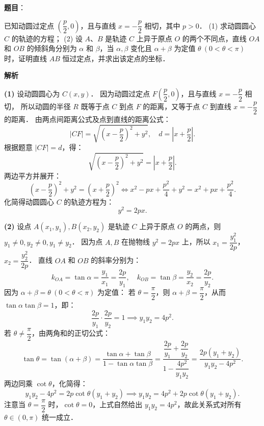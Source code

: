 \begin{answer}


\end{answer}
\begin{answer}

\textbf{题目}：

已知动圆过定点 $\left(\dfrac{p}{2}, 0\right)$，且与直线 $x = -\dfrac{p}{2}$ 相切，其中 $p > 0$．
(1) 求动圆圆心 $C$ 的轨迹的方程；
(2) 设 $A$、$B$ 是轨迹 $C$ 上异于原点 $O$ 的两个不同点，直线 $OA$ 和 $OB$ 的倾斜角分别为 $\alpha$ 和 $\beta$，当 $\alpha, \beta$ 变化且 $\alpha + \beta$ 为定值 $\theta\ (0 < \theta < \pi)$ 时，证明直线 $AB$ 恒过定点，并求出该定点的坐标．

\textbf{解析}

\textbf{(1)}
设动圆圆心为 $C(x, y)$．
因为动圆过定点 $F\left(\dfrac{p}{2}, 0\right)$，且与直线 $x = -\dfrac{p}{2}$ 相切，
所以动圆的半径 $R$ 既等于点 $C$ 到点 $F$ 的距离，又等于点 $C$ 到直线 $x = -\dfrac{p}{2}$ 的距离．
由两点间距离公式及点到直线的距离公式：
\nopagebreak[4]
\[
|CF| = \sqrt{\left(x - \dfrac{p}{2}\right)^2 + y^2}, \quad d = \left|x + \dfrac{p}{2}\right|.
\]
根据题意 $|CF| = d$，得：
\nopagebreak[4]
\[
\sqrt{\left(x - \dfrac{p}{2}\right)^2 + y^2} = \left|x + \dfrac{p}{2}\right|.
\]
两边平方并展开：
\nopagebreak[4]
\[
\left(x - \dfrac{p}{2}\right)^2 + y^2 = \left(x + \dfrac{p}{2}\right)^2 \iff x^2 - px + \dfrac{p^2}{4} + y^2 = x^2 + px + \dfrac{p^2}{4}.
\]
化简得动圆圆心 $C$ 的轨迹方程为：
\nopagebreak[4]
\[
y^2 = 2px.
\]

\textbf{(2)}
设点 $A(x_1, y_1), B(x_2, y_2)$ 是轨迹 $C$ 上异于原点 $O$ 的两点，则 $y_1 \neq 0, y_2 \neq 0, y_1 \neq y_2$．
因为点 $A, B$ 在抛物线 $y^2 = 2px$ 上，所以 $x_1 = \dfrac{y_1^2}{2p}$，$x_2 = \dfrac{y_2^2}{2p}$．
直线 $OA$ 和 $OB$ 的斜率分别为：
\nopagebreak[4]
\[
k_{OA} = \tan\alpha = \dfrac{y_1}{x_1} = \dfrac{2p}{y_1}, \quad k_{OB} = \tan\beta = \dfrac{y_2}{x_2} = \dfrac{2p}{y_2}.
\]
因为 $\alpha + \beta = \theta\ (0 < \theta < \pi)$ 为定值：
若 $\theta = \dfrac{\pi}{2}$，则 $\alpha + \beta = \dfrac{\pi}{2}$，从而 $\tan\alpha \tan\beta = 1$，即：
\nopagebreak[4]
\[
\dfrac{2p}{y_1} \cdot \dfrac{2p}{y_2} = 1 \implies y_1 y_2 = 4p^2.
\]
若 $\theta \neq \dfrac{\pi}{2}$，由两角和的正切公式：
\nopagebreak[4]
\[
\tan\theta = \tan(\alpha + \beta) = \dfrac{\tan\alpha + \tan\beta}{1 - \tan\alpha\tan\beta} = \dfrac{\dfrac{2p}{y_1} + \dfrac{2p}{y_2}}{1 - \dfrac{4p^2}{y_1 y_2}} = \dfrac{2p(y_1 + y_2)}{y_1 y_2 - 4p^2}.
\]
两边同乘 $\cot\theta$，化简得：
\nopagebreak[4]
\[
y_1 y_2 - 4p^2 = 2p\cot\theta (y_1 + y_2) \implies y_1 y_2 = 4p^2 + 2p\cot\theta (y_1 + y_2).
\]
注意当 $\theta = \dfrac{\pi}{2}$ 时，$\cot\theta = 0$，上式自然给出 $y_1 y_2 = 4p^2$，故此关系式对所有 $\theta \in (0, \pi)$ 统一成立．


\end{answer}
